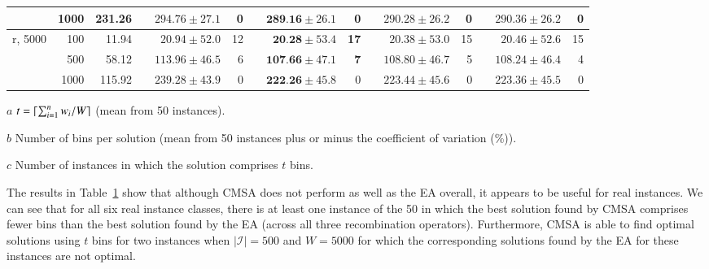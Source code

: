 \documentclass[a4paper,11pt,authoryear]{elsarticle}
\begin{document}
\begin{table}[h]
\begin{threeparttable}
\begin{tabular}{crrcrrcrrcrrcrr}
	& 1000 & 231.26 && $294.76 \pm 27.1$ & 0 && $\textbf{289.16} \pm 26.1$ & 0 && $290.28 \pm 26.2$ & 0 && $290.36 \pm 26.2$ & 0 \\
	\midrule
	r, 5000 & 100 & 11.94 && $20.94 \pm 52.0$ & 12 && $\textbf{20.28} \pm 53.4$ & \textbf{17} && $20.38 \pm 53.0$ & 15 && $20.46 \pm 52.6$ & 15 \\
	& 500 & 58.12 && $113.96 \pm 46.5$ & 6 && $\textbf{107.66} \pm 47.1$ & \textbf{7} && $108.80 \pm 46.7$ & 5 && $108.24 \pm 46.4$ & 4 \\		
	& 1000 & 115.92 && $239.28 \pm 43.9$ & 0 && $\textbf{222.26} \pm 45.8$ & 0 && $223.44 \pm 45.6$ & 0 && $223.36 \pm 45.5$ & 0 \\
	\bottomrule
\end{tabular}	
\vspace{0.2cm} %
\begin{tablenotes}
	\tiny
	\item[$a$] $t = \lceil\sum_{i=1}^{n} w_i / W\rceil$ (mean from 50 instances).
	\item[$b$] Number of bins per solution (mean from 50 instances plus or minus the coefficient of variation (\%)).
	\item[$c$] Number of instances in which the solution comprises $t$ bins.
\end{tablenotes}
\end{threeparttable}
\label{table:cmsa}
\end{table}

The results in Table~\ref{table:cmsa} show that although CMSA does not perform as well as the EA overall, it appears to be useful for real instances. We can see that for all six real instance classes, there is at least one instance of the 50 in which the best solution found by CMSA comprises fewer bins than the best solution found by the EA (across all three recombination operators). Furthermore, CMSA is able to find optimal solutions using $t$ bins for two instances when $|\mathcal{I}| = 500$ and $W = 5000$ for which the corresponding solutions found by the EA for these instances are not optimal. 
\end{document}
